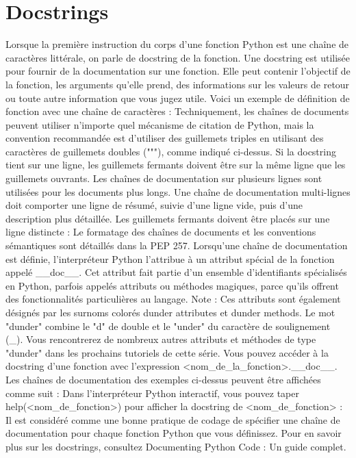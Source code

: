 \section{Docstrings}
Lorsque la première instruction du corps d'une fonction Python est une chaîne de caractères littérale, on parle de docstring de la fonction.  Une docstring est utilisée pour fournir de la documentation sur une fonction.  Elle peut contenir l'objectif de la fonction, les arguments qu'elle prend, des informations sur les valeurs de retour ou toute autre information que vous jugez utile.
Voici un exemple de définition de fonction avec une chaîne de caractères :
Techniquement, les chaînes de documents peuvent utiliser n'importe quel mécanisme de citation de Python, mais la convention recommandée est d'utiliser des guillemets triples en utilisant des caractères de guillemets doubles ("""), comme indiqué ci-dessus.  Si la docstring tient sur une ligne, les guillemets fermants doivent être sur la même ligne que les guillemets ouvrants.
Les chaînes de documentation sur plusieurs lignes sont utilisées pour les documents plus longs.  Une chaîne de documentation multi-lignes doit comporter une ligne de résumé, suivie d'une ligne vide, puis d'une description plus détaillée.  Les guillemets fermants doivent être placés sur une ligne distincte :
Le formatage des chaînes de documents et les conventions sémantiques sont détaillés dans la PEP 257.
Lorsqu'une chaîne de documentation est définie, l'interpréteur Python l'attribue à un attribut spécial de la fonction appelé __doc__. Cet attribut fait partie d'un ensemble d'identifiants spécialisés en Python, parfois appelés attributs ou méthodes magiques, parce qu'ils offrent des fonctionnalités particulières au langage.  
Note : Ces attributs sont également désignés par les surnoms colorés dunder attributes et dunder methods. Le mot "dunder" combine le "d" de double et le "under" du caractère de soulignement (_). Vous rencontrerez de nombreux autres attributs et méthodes de type "dunder" dans les prochains tutoriels de cette série.
Vous pouvez accéder à la docstring d'une fonction avec l'expression <nom_de_la_fonction>.__doc__.  Les chaînes de documentation des exemples ci-dessus peuvent être affichées comme suit :
Dans l'interpréteur Python interactif, vous pouvez taper help(<nom_de_fonction>) pour afficher la docstring de <nom_de_fonction> :
Il est considéré comme une bonne pratique de codage de spécifier une chaîne de documentation pour chaque fonction Python que vous définissez.  Pour en savoir plus sur les docstrings, consultez Documenting Python Code : Un guide complet.
